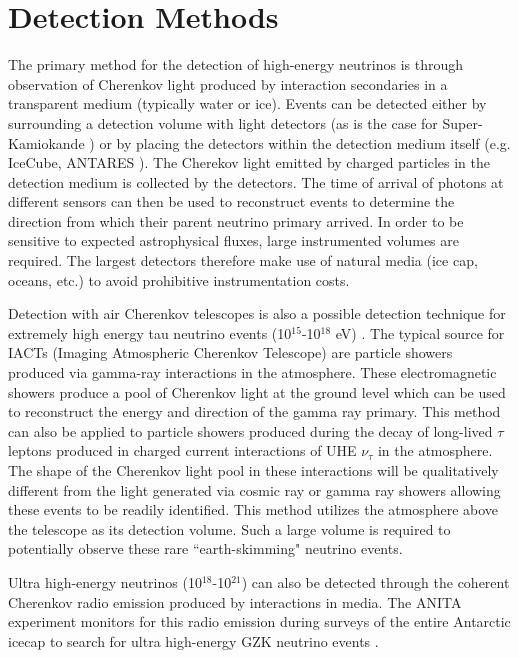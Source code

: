 \documentclass{gatech-thesis}
\begin{document}
\section{Detection Methods}

The primary method for the detection of high-energy neutrinos is through observation of Cherenkov light produced by interaction secondaries in a transparent medium (typically water or ice). Events can be detected either by surrounding a detection volume with light detectors (as is the case for Super-Kamiokande \cite{2003NIMPA.501..418F}) or by placing the detectors within the detection medium itself (e.g. IceCube, ANTARES \cite{2011NIMPA.656...11A}). The Cherekov light emitted by charged particles in the detection medium is collected by the detectors. The time of arrival of photons at different sensors can then be used to reconstruct events to determine the direction from  which their parent neutrino primary arrived. In order to be sensitive to expected astrophysical fluxes, large instrumented volumes are required. The largest detectors therefore make use of natural media (ice cap, oceans, etc.) to avoid prohibitive instrumentation costs.

Detection with air Cherenkov telescopes is also a possible detection technique for extremely high energy tau neutrino events (10$^{15}$-10$^{18}$ eV) \cite{2013APh....41....7A}. The typical source for IACTs (Imaging Atmospheric Cherenkov Telescope) are particle showers produced via gamma-ray interactions in the atmosphere. These electromagnetic showers produce a pool of Cherenkov light at the ground level which can be used to reconstruct the energy and direction of the gamma ray primary. This method can also be applied to particle showers produced during the decay of long-lived $\tau$ leptons produced in charged current interactions of UHE $\nu_{\tau}$ in the atmosphere. The shape of the Cherenkov light pool in these interactions will be qualitatively different from the light generated via cosmic ray or gamma ray showers allowing these events to be readily identified. This method utilizes the atmosphere above the telescope as its detection volume. Such a large volume is required to potentially observe these rare ``earth-skimming" neutrino events.

Ultra high-energy neutrinos (10$^{18}$-10$^{21}$) can also be detected through the coherent Cherenkov radio emission produced by interactions in media. The ANITA experiment monitors for this radio emission during surveys of the entire Antarctic icecap to search for ultra high-energy GZK neutrino events \cite{2010PhRvD..82b2004G}. 
\end{document}
